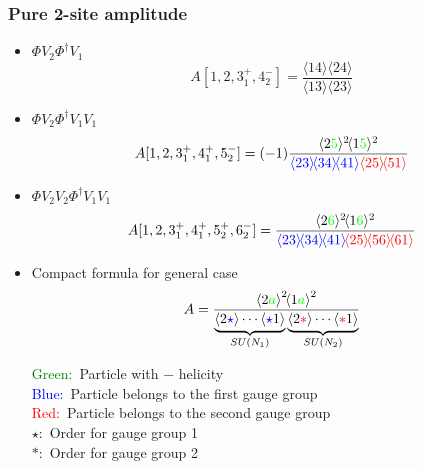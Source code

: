 \documentclass{beamer}
\newcommand{\avg}[1]{\langle #1 \rangle}
\newcommand{\mdavg}[2]{\langle #1 \rangle\!\langle #2 \rangle}
\newcommand{\asqu}[1]{{\langle#1\rangle}^2}
\begin{document}
\begin{frame}
    \frametitle{Pure 2-site amplitude}
    \begin{itemize}
        \item $\Phi V_2 \Phi^\dagger V_1$
        \begin{equation*}
            A[1,2,3_1^+,4_2^-]=\frac{\mdavg{14}{24}}{\mdavg{13}{23}}
        \end{equation*}
        \item $\Phi V_2 \Phi^\dagger V_1V_1$
        \begin{equation*}
            A[1,2,3_1^+,4_1^+,5_2^-]=(-1)\frac{\avg{2\textcolor{green}{5}}^2\!\avg{1\textcolor{green}{5}}^2}{\textcolor{blue}{\mdavg{23}{34}\!\avg{41}}\textcolor{red}{\mdavg{25}{51}}}
        \end{equation*}
        \item $\Phi V_2V_2 \Phi^\dagger V_1V_1$
        \begin{equation*}
            A[1,2,3_1^+,4_1^+,5_2^+,6_2^-]=\frac{\avg{2\textcolor{green}{6}}^2\!\avg{1\textcolor{green}{6}}^2}{\textcolor{blue}{\mdavg{23}{34}\!\avg{41}}\!\textcolor{red}{\mdavg{25}{56}\!\avg{61}}}
        \end{equation*}       
    \end{itemize}
\end{frame}

\begin{frame}
    \begin{itemize}
        \item Compact formula for general case
        \begin{equation*}
            A=\frac{\asqu{2\textcolor{green}{a}}\!\asqu{1\textcolor{green}{a}}}{\underbrace{\avg{2\textcolor{blue}{\star}}\cdots \avg{\textcolor{blue}{\star}1}}_{SU(N_1)}\underbrace{\avg{2\textcolor{red}{\ast} }\cdots \avg{\textcolor{red}{\ast} 1}}_{SU(N_2)}}
        \end{equation*} 
        \begin{minipage}{0.7\textwidth}
            \raggedright  %
            \textcolor{green}{Green:} \,Particle with $-$ helicity\\
            \textcolor{blue}{Blue:}\, Particle belongs to the first gauge group\\
            \textcolor{red}{Red:}\, Particle belongs to the second gauge group\\
            $\star$: \,Order for gauge group 1\\
            $\ast$: \,Order for gauge group 2 
            \end{minipage}
       
    \end{itemize}
\end{frame}
\end{document}
